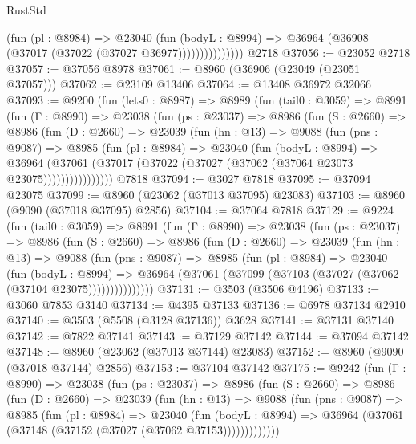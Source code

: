 \begin{lexlean}{RustStd}
\begin{coremodule}
                      (fun (pl : @8984) =>
                      @23040
                        (fun (bodyL : @8994) =>
                        @36964 (@36908 (@37017 (@37022 (@37027 @36977)))))))))))))))
    @2718
@37056 := @23052 @2718
@37057 := @37056 @8978
@37061 := @8960 (@36906 (@23049 (@23051 @37057)))
@37062 := @23109 @13406
@37064 := @13408 @36972 @32066
@37093 := @9200
    (fun (lets0 : @8987) =>
    @8989
      (fun (tail0 : @3059) =>
      @8991
        (fun (Γ : @8990) =>
        @23038
          (fun (ps : @23037) =>
          @8986
            (fun (S : @2660) =>
            @8986
              (fun (D : @2660) =>
              @23039
                (fun (hn : @13) =>
                @9088
                  (fun (pns : @9087) =>
                  @8985
                    (fun (pl : @8984) =>
                    @23040
                      (fun (bodyL : @8994) =>
                      @36964
                        (@37061
                          (@37017 (@37022 (@37027 (@37062 (@37064 @23073 @23075))))))))))))))))
    @7818
@37094 := @3027 @7818
@37095 := @37094 @23075
@37099 := @8960 (@23062 (@37013 @37095) @23083)
@37103 := @8960 (@9090 (@37018 @37095) @2856)
@37104 := @37064 @7818
@37129 := @9224
    (fun (tail0 : @3059) =>
    @8991
      (fun (Γ : @8990) =>
      @23038
        (fun (ps : @23037) =>
        @8986
          (fun (S : @2660) =>
          @8986
            (fun (D : @2660) =>
            @23039
              (fun (hn : @13) =>
              @9088
                (fun (pns : @9087) =>
                @8985
                  (fun (pl : @8984) =>
                  @23040
                    (fun (bodyL : @8994) =>
                    @36964 (@37061 (@37099 (@37103 (@37027 (@37062 (@37104 @23075)))))))))))))))
@37131 := @3503 (@3506 @4196)
@37133 := @3060 @7853 @3140
@37134 := @4395 @37133
@37136 := @6978 @37134 @2910
@37140 := @3503 (@5508 (@3128 @37136)) @3628
@37141 := @37131 @37140
@37142 := @7822 @37141
@37143 := @37129 @37142
@37144 := @37094 @37142
@37148 := @8960 (@23062 (@37013 @37144) @23083)
@37152 := @8960 (@9090 (@37018 @37144) @2856)
@37153 := @37104 @37142
@37175 := @9242
    (fun (Γ : @8990) =>
    @23038
      (fun (ps : @23037) =>
      @8986
        (fun (S : @2660) =>
        @8986
          (fun (D : @2660) =>
          @23039
            (fun (hn : @13) =>
            @9088
              (fun (pns : @9087) =>
              @8985
                (fun (pl : @8984) =>
                @23040
                  (fun (bodyL : @8994) =>
                  @36964 (@37061 (@37148 (@37152 (@37027 (@37062 @37153)))))))))))))

\end{coremodule}
\end{lexlean}
